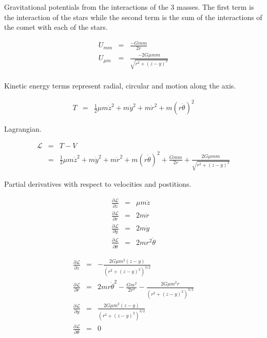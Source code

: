 \documentclass{article}
\begin{document}
Gravitational potentials from the interactions of the 3 masses. The first term is the interaction of the
stars while the second term is the sum of the interactions of the comet with each of the stars.

\begin{eqnarray}
U_{m m} & = & \frac{-Gmm}{2r} \\
U_{\mu m} & = & \frac{-2G\mu mm}{\sqrt{r^2 + (z-y)^2}} \\
\label{eq:potentials}
\end{eqnarray}

Kinetic energy terms represent radial, circular and motion along the axis.

\begin{eqnarray}
T & = & \frac{1}{2} \mu m \dot{z}^2 + m \dot{y}^2 + m \dot{r}^2 + m(r\dot{\theta})^2
\label{eq:potentials}
\end{eqnarray}

Lagrangian.

\begin{eqnarray}
\mathcal{L} & = & T - V \\
& = & \frac{1}{2} \mu m \dot{z}^2 + m \dot{y}^2 + m \dot{r}^2 + m(r\dot{\theta})^2 + \frac{Gmm}{2r} +  \frac{2G\mu mm}{\sqrt{r^2 + (z-y)^2}}
\label{eq:potentials}
\end{eqnarray}

Partial derivatives with respect to velocities and postitions.

\begin{eqnarray}
\frac{\partial{\mathcal{L}}}{\partial{ \dot{z}}} & = & \mu m \dot{z} \\
\frac{\partial{\mathcal{L}}}{\partial{ \dot{r}}} & = & 2m\dot{r} \\
\frac{\partial{\mathcal{L}}}{\partial{ \dot{y}}} & = & 2m\dot{y} \\
\frac{\partial{\mathcal{L}}}{\partial{ \dot{\theta}}} & = & 2mr^2\dot{\theta} 
\end{eqnarray}

\begin{eqnarray}
\frac{\partial{\mathcal{L}}}{\partial{z}} & = & -\frac{2G \mu m^2 (z-y)}{(r^2 + (z-y)^2)^{3/2}} \\
\frac{\partial{\mathcal{L}}}{\partial{r}} & = & 2mr\dot{\theta}^2 - \frac{G m^2}{2r^2} - \frac{2 G \mu m^2 r}{(r^2 + (z-y)^2)^{3/2}} \\
\frac{\partial{\mathcal{L}}}{\partial{y}} & = & \frac{2G \mu m^2 (z-y)}{(r^2 + (z-y)^2)^{3/2}} \\
\frac{\partial{\mathcal{L}}}{\partial{\theta}} & = & 0 
\end{eqnarray}
\end{document}
